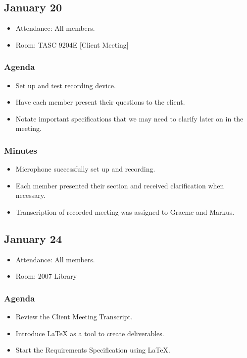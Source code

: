 \documentclass{article}
\begin{document}
\subsection{January 20}
\begin{itemize}
\item Attendance: All members.
\item Room: TASC 9204E [Client Meeting]
\end{itemize}
\subsubsection{Agenda}
\begin{itemize}
\item Set up and test recording device.
\item Have each member present their questions to the client.
\item Notate important specifications that we may need to clarify later on in the meeting.
\end{itemize}
\subsubsection{Minutes}
\begin{itemize}
\item Microphone successfully set up and recording.
\item Each member presented their section and received clarification when necessary.
\item Transcription of recorded meeting was assigned to Graeme and Markus.
\end{itemize}

\subsection{January 24}
\begin{itemize}
\item Attendance: All members.
\item Room: 2007 Library
\end{itemize}
\subsubsection{Agenda}
\begin{itemize}
\item Review the Client Meeting Transcript.
\item Introduce LaTeX as a tool to create deliverables.
\item Start the Requirements Specification using LaTeX.
\end{itemize}
\end{document}
